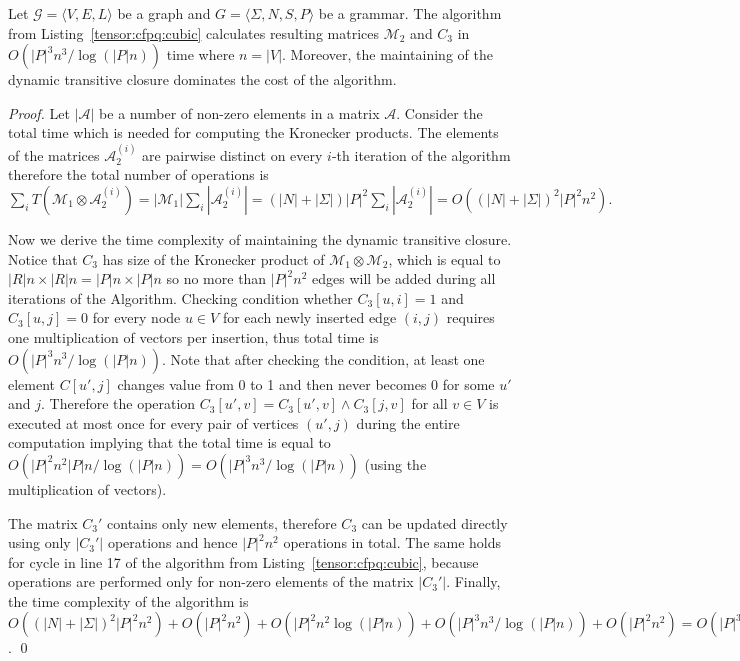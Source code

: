 \begin{theorem}{}
\label{theorem: subcubic}
    Let $\mathcal{G} = \langle V,E,L \rangle$ be a graph and $G = \langle\Sigma, N, S, P\rangle$ be a grammar.
    The algorithm from Listing~\ref{tensor:cfpq:cubic} calculates resulting matrices $\mathcal{M}_2$ and $C_3$ in $O({|P|}^3n^3/\log (|P|n))$ time where $n = |V|$. Moreover, the maintaining of the dynamic transitive closure dominates the cost of the algorithm.
\end{theorem}

\begin{proof}
 Let $|\mathcal{A}|$ be a number of non-zero elements in a matrix $\mathcal{A}$. Consider the total time which is needed for computing the Kronecker products. The elements of the matrices $\mathcal{A}_2^{(i)}$ are pairwise distinct on every $i$-th iteration of the algorithm therefore the total number of operations is $\sum\limits_i{T(\mathcal{M}_1 \otimes \mathcal{A}_2^{(i)})} = |\mathcal{M}_1| \sum\limits_i {|\mathcal{A}_2^{(i)}|} = (|N| + |\Sigma|){|P|}^2 \sum\limits_i {|\mathcal{A}_2^{(i)}|} = O({(|N| + |\Sigma|)}^2{|P|}^2 n^2).$


Now we derive the time complexity of maintaining the dynamic transitive closure.
Notice that $C_3$ has size of the Kronecker product of $\mathcal{M}_1 \otimes \mathcal{M}_2$, which is equal to $|R|n \times |R|n = |P|n \times |P|n$ so no more than ${|P|}^2n^2$ edges will be added during all iterations of the Algorithm. 
Checking condition whether $C_3[u, i] = 1$ and $C_3[u, j]=0$ for every node $u \in V$ for each newly inserted edge $(i, j)$ requires one multiplication of vectors per insertion, thus total time is $O({|P|}^3n^3/\log (|P|n))$.
Note that after checking the condition, at least one element $C[u', j]$ changes value from 0 to 1 and then never becomes 0 for some $u'$ and $j$.
Therefore the operation $C_3[u',v] = C_3[u', v] \wedge C_3[j, v]$ for all $v \in V$ is executed at most once for every pair of vertices $(u',j)$ during the entire computation implying that the total time is equal to $O({|P|}^2n^2|P|n/\log (|P|n))=O({|P|}^3n^3/\log (|P|n))$ (using the  multiplication of vectors).


The matrix $C_3'$ contains only new elements, therefore $C_3$ can be updated directly using only $|C_3'|$ operations and hence ${|P|}^2n^2$ operations in total.
The same holds for cycle in line 17 of the algorithm from Listing~\ref{tensor:cfpq:cubic}, because operations are performed only for non-zero elements of the matrix $|C_3'|$.
Finally, the time complexity of the algorithm is $O({(|N| + |\Sigma|)}^2{|P|}^2 n^2) + O({|P|}^2n^2) + O({|P|}^2n^2 \log (|P|n)) + O({|P|}^3n^3/\log (|P|n)) + O({|P|}^2n^2)= O({|P|}^3n^3/\log (|P|n))$. \qed
\end{proof}

